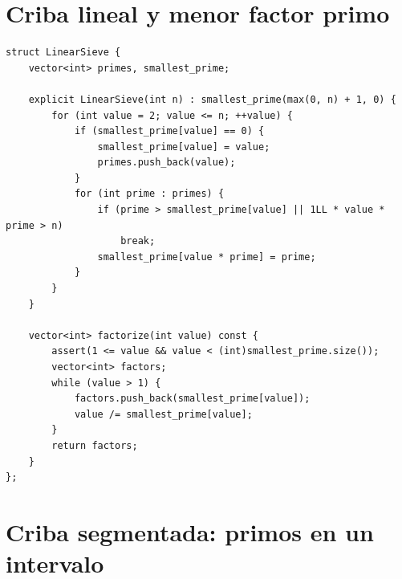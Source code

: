 \section{Criba lineal y menor factor primo}

\begin{lstlisting}[style=cpp]
struct LinearSieve {
    vector<int> primes, smallest_prime;

    explicit LinearSieve(int n) : smallest_prime(max(0, n) + 1, 0) {
        for (int value = 2; value <= n; ++value) {
            if (smallest_prime[value] == 0) {
                smallest_prime[value] = value;
                primes.push_back(value);
            }
            for (int prime : primes) {
                if (prime > smallest_prime[value] || 1LL * value * prime > n)
                    break;
                smallest_prime[value * prime] = prime;
            }
        }
    }

    vector<int> factorize(int value) const {
        assert(1 <= value && value < (int)smallest_prime.size());
        vector<int> factors;
        while (value > 1) {
            factors.push_back(smallest_prime[value]);
            value /= smallest_prime[value];
        }
        return factors;
    }
};
\end{lstlisting}


\section{Criba segmentada: primos en un intervalo}

